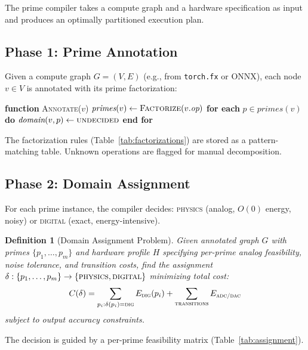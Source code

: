 \documentclass[11pt]{article}
\newtheorem{definition}{Definition}
\begin{document}
The prime compiler takes a compute graph and a hardware specification as input and produces an optimally partitioned execution plan.

\subsection{Phase 1: Prime Annotation}

Given a compute graph $G = (V, E)$ (e.g., from \texttt{torch.fx} or ONNX), each node $v \in V$ is annotated with its prime factorization:

\begin{algorithmic}
\STATE \textbf{function} \textsc{Annotate}($v$)
\STATE \quad $\textit{primes}(v) \gets \textsc{Factorize}(v.\textit{op})$
\STATE \quad \textbf{for each} $p \in \textit{primes}(v)$ \textbf{do}
\STATE \quad \quad $\textit{domain}(v, p) \gets \textsc{undecided}$
\STATE \quad \textbf{end for}
\end{algorithmic}

The factorization rules (Table~\ref{tab:factorizations}) are stored as a pattern-matching table. Unknown operations are flagged for manual decomposition.

\subsection{Phase 2: Domain Assignment}

For each prime instance, the compiler decides: \textsc{physics} (analog, $O(0)$ energy, noisy) or \textsc{digital} (exact, energy-intensive).

\begin{definition}[Domain Assignment Problem]
Given annotated graph $G$ with primes $\{p_1, \ldots, p_m\}$ and hardware profile $H$ specifying per-prime analog feasibility, noise tolerance, and transition costs, find the assignment $\delta: \{p_1, \ldots, p_m\} \to \{\textsc{physics}, \textsc{digital}\}$ minimizing total cost:
\begin{equation}
C(\delta) = \sum_{p_i: \delta(p_i)=\textsc{dig}} E_{\textsc{dig}}(p_i) + \sum_{\textsc{transitions}} E_{\textsc{adc/dac}}
\end{equation}
subject to output accuracy constraints.
\end{definition}

The decision is guided by a per-prime feasibility matrix (Table~\ref{tab:assignment}).
\end{document}

